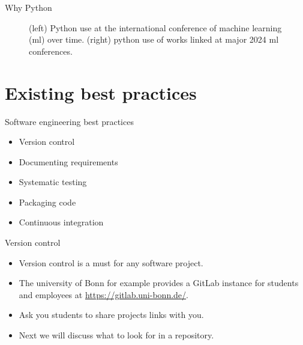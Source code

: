 \documentclass{beamer}
\begin{document}
    \begin{frame}{Why Python}
      \begin{figure}
        
        
        \caption{(left) Python use at the international conference of machine learning (ml) over time.
                 (right) python use of works linked at major 2024 ml conferences.}
      \end{figure}
    \end{frame}


    \section{Existing best practices}
    \begin{frame}{Software engineering best practices}
      \begin{itemize}
        \item Version control
        \item Documenting requirements
        \item Systematic testing
        \item Packaging code
        \item Continuous integration
      \end{itemize}

    \end{frame}

    \begin{frame}{Version control}
      \begin{itemize}
        \item Version control is a must for any software project.
        \item The university of Bonn for example provides a GitLab instance for students and employees
        at \url{https://gitlab.uni-bonn.de/}.
        \item Ask you students to share projects links with you.
        \item Next we will discuss what to look for in a repository.
      \end{itemize}
    \end{frame}
\end{document}
